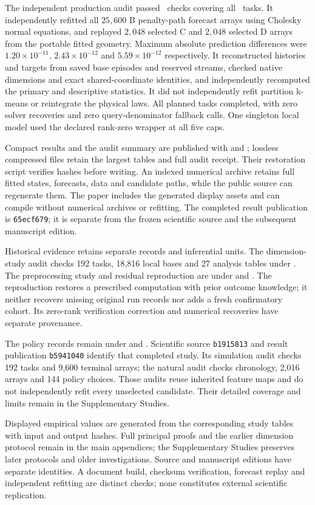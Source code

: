 The independent production audit passed \SAAuditChecks\ checks
covering all \SATasks\ tasks. It independently refitted all $25{,}600$
B penalty-path forecast arrays using Cholesky normal equations,
and replayed $2{,}048$ selected C and $2{,}048$ selected D arrays
from the portable fitted geometry. Maximum absolute prediction
differences were $1.20\times10^{-11}$, $2.43\times10^{-12}$ and
$5.59\times10^{-12}$ respectively. It reconstructed histories and
targets from saved base episodes and reserved streams, checked
native dimensions and exact shared-coordinate identities, and
independently recomputed the primary and descriptive statistics.
It did not independently refit partition k-means or reintegrate the
physical laws. All planned tasks completed, with zero solver
recoveries and zero query-denominator fallback calls. One singleton
local model used the declared rank-zero wrapper at all five caps.

Compact results and the audit summary are published with
 and ; lossless compressed files
retain the largest tables and full audit receipt. Their restoration
script verifies hashes before writing. An indexed numerical archive
retains full fitted states, forecasts, data and candidate paths,
while the public source can regenerate them. The paper includes
the generated display assets and can compile without numerical
archives or refitting. The completed result publication is
\texttt{65ecf679}; it is separate from the frozen scientific
source and the subsequent manuscript edition.

Historical evidence retains separate records and inferential units.
The dimension-study audit checks 192 tasks, 18,816 local bases and
27 analysis tables under .
The preprocessing study and residual reproduction are under
 and
.
The reproduction restores a prescribed computation with prior outcome
knowledge; it neither recovers missing original run records nor adds
a fresh confirmatory cohort. Its zero-rank verification correction and
numerical recoveries have separate provenance.

The policy records remain under
 and
.
Scientific source \texttt{b1915813} and result publication
\texttt{b5941040} identify that completed study.
Its simulation audit checks 192 tasks and 9,600 terminal arrays;
the natural audit checks chronology, 2,016 arrays and 144 policy
choices. Those audits reuse inherited feature maps and do not
independently refit every unselected candidate. Their detailed
coverage and limits remain in the Supplementary Studies.

Displayed empirical values are generated from the corresponding
study tables with input and output hashes. Full principal proofs
and the earlier dimension protocol remain in the main appendices;
the Supplementary Studies preserves later protocols and older
investigations. Source and manuscript editions have separate
identities. A document build, checksum verification, forecast replay
and independent refitting are distinct checks; none constitutes
external scientific replication.
